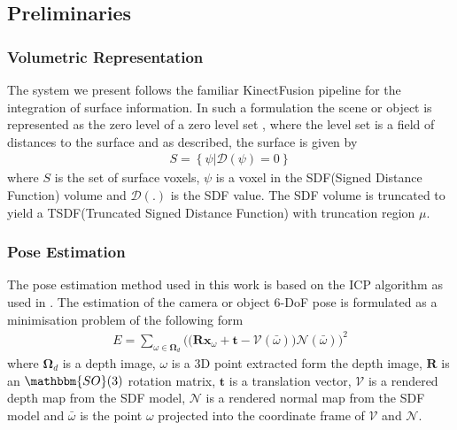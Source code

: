 \subsection{Preliminaries}
\subsubsection{Volumetric Representation}
The system we present follows the familiar KinectFusion \cite{Newcombe2011} pipeline for the integration of surface information. In such a 
formulation the scene or object is represented as the zero level of a zero level set \cite{Curless1996}, where the level set is a field of distances 
to the surface and as described, the surface is given by
\begin{equation}
\begin{split}
S = \left\{\psi | \mathcal{D}(\psi) = 0\right\}
\end{split}
\end{equation}
where $S$ is the set of surface voxels, $\psi$ is a voxel in the SDF(Signed Distance Function) volume and $\mathcal{D}(.)$ is the SDF value. 
The SDF volume is truncated to yield a TSDF(Truncated Signed Distance Function) with truncation region $\mu$.

\subsubsection{Pose Estimation}
The pose estimation method used in this work is based on the ICP algorithm as used in \cite{Newcombe2011, Prisacariu2014}. The estimation of 
the camera or object 6-DoF pose is formulated as a minimisation problem of the following form
\begin{equation}
\begin{split}
E = \sum_{\omega \in \bm{\Omega}_{d}} \bigg( \big( \bm{R}\bm{x}_{\omega} + \bm{t} - \mathcal{V}(\bar{\omega}) \big)\mathcal{N}(\bar{\omega}) \bigg)^{2}
\end{split}
\end{equation}
where $\bm{\Omega}_{d}$ is a depth image, $\omega$ is a 3D point extracted form the depth image, $\bm{R}$ is an  $\mathbbm{SO}(3)$ 
rotation matrix, $\bm{t}$ is a translation vector, $\mathcal{V}$ is a rendered depth map from the SDF model, $\mathcal{N}$ is a rendered 
normal map from the SDF model and $\bar{\omega}$ is the point $\omega$ projected into the coordinate frame of $\mathcal{V}$ and 
$\mathcal{N}$.

